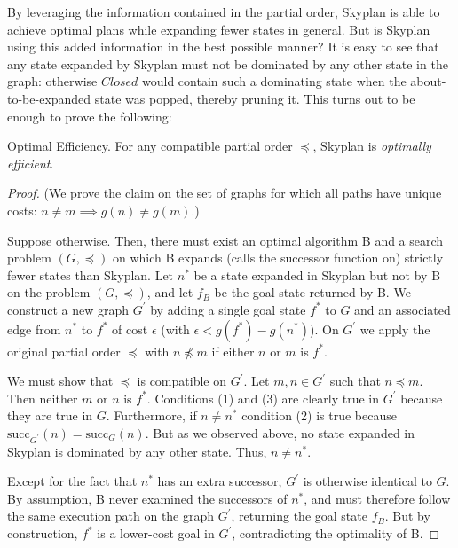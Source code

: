 \documentclass[letterpaper]{article}
\theoremstyle{plain} \newtheorem{theorem}{Theorem} \newtheorem{proposition}{Proposition} \newtheorem{lemma}{Lemma}
\theoremstyle{definition} \newtheorem{definition}{Definition} \newtheorem{conjecture}{Conjecture} \newtheorem*{example}{Example}
\theoremstyle{remark} \newtheorem*{remark}{Remark} \newtheorem*{note}{Note} \newtheorem{case}{Case}
\begin{document}
By leveraging the information contained in the partial order, Skyplan is able to achieve
optimal plans while expanding fewer states in general.  But is Skyplan using this added
information in the best possible manner? It is easy to see that any state expanded by 
Skyplan must not be dominated by any other state in the graph: otherwise $Closed$ would
contain such a dominating state when the about-to-be-expanded
state was popped, thereby pruning it.  This turns out to be
enough to prove the following:

\begin{claim}{Optimal Efficiency.}\label{clm-optimally-efficient}
For any compatible partial order $\preceq$, Skyplan is \emph{optimally efficient}.
\end{claim}
\begin{proof} 
(We prove the claim on the set of graphs for which all paths have unique costs: $n \neq m \implies g(n) \neq g(m)$.)

Suppose otherwise. Then, there must exist an optimal algorithm B and a search problem $(G,\preceq)$ 
on which B expands (calls the successor function on) strictly fewer states than Skyplan. 
Let $n^{*}$ be a state expanded in Skyplan but not by B on the problem $(G,\preceq)$, and let
$f_{B}$ be the goal state returned by B. We construct a new graph $G^\prime$ by adding a single goal state $f^*$ to $G$ 
and an associated edge from $n^*$ to $f^*$ of cost $\epsilon$ (with $\epsilon < g(f^*)-g(n^*)$). 
On $G^\prime$ we apply the original partial order $\preceq$ with $n \npreceq m$ if either $n$ or $m$ is $f^*$.

We must show that $\preceq$ is compatible on $G^\prime$. 
Let $m,n \in G^\prime$ such that $n \preceq m$. Then neither $m$ or $n$ is $f^*$. Conditions (1) and (3) %
are clearly true in $G^\prime$ because they are true in $G$.  Furthermore, if $n \neq n^*$ condition (2) is true 
because $\mathrm{succ}_{G^\prime}(n) = \mathrm{succ}_{G}(n)$. 
But as we observed above, no state expanded in Skyplan is
dominated by any other state. Thus, $n \neq n^*$.

Except for the fact that $n^*$ has an extra successor, $G^\prime$ is otherwise
 identical to $G$. By assumption, B never examined the successors of $n^*$, and 
must therefore follow the same execution path on the graph $G^\prime$, returning the goal state $f_B$.
But by construction, $f^*$ is a lower-cost goal in $G^\prime$, contradicting the optimality of B.
 \end{proof}
\end{document}
